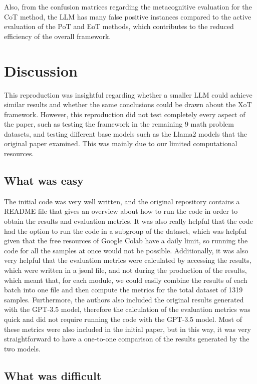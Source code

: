 \documentclass[10pt]{article} %
\begin{document}
Also, from the confusion matrices regarding the metacognitive evaluation for the CoT method, the LLM has many false positive instances compared to the active evaluation of the PoT and EoT methods, which contributes to the reduced efficiency of the overall framework.

\section{Discussion}

This reproduction was insightful regarding whether a smaller LLM could achieve similar results and whether the same conclusions could be drawn about the XoT framework. However, this reproduction did not test completely every aspect of the paper, such as testing the framework in the remaining 9 math problem datasets, and testing different base models such as the Llama2 models that the original paper examined. This was mainly due to our limited computational resources.

\subsection{What was easy}

The initial code was very well written, and the original repository contains a README file that gives an overview about how to run the code in order to obtain the results and evaluation metrics. It was also really helpful that the code had the option to run the code in a subgroup of the dataset, which was helpful given that the free resources of Google Colab have a daily limit, so running the code for all the samples at once would not be possible. Additionally, it was also very helpful that the evaluation metrics were calculated by accessing the results, which were written in a jsonl file, and not during the production of the results, which meant that, for each module, we could easily combine the results of each batch into one file and then compute the metrics for the total dataset of 1319 samples. Furthermore, the authors also included the original results generated with the GPT-3.5 model, therefore the calculation of the evaluation metrics was quick and did not require running the code with the GPT-3.5 model. Most of these metrics were also included in the initial paper, but in this way, it was very straightforward to have a one-to-one comparison of the results generated by the two models.

\subsection{What was difficult}
\end{document}
